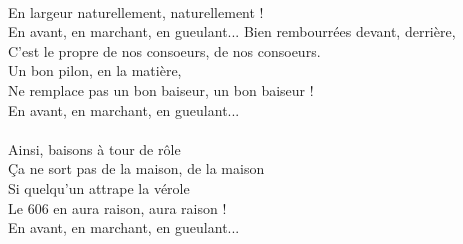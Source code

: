 \\En largeur naturellement, naturellement !
\\En avant, en marchant, en gueulant...
\breakpage
Bien rembourrées devant, derrière,
\\C'est le propre de nos consoeurs, de nos consoeurs.
\\Un bon pilon, en la matière,
\\Ne remplace pas un bon baiseur, un bon baiseur !
\\En avant, en marchant, en gueulant...
\\\\Ainsi, baisons à tour de rôle
\\Ça ne sort pas de la maison, de la maison
\\Si quelqu'un attrape la vérole
\\Le 606 en aura raison, aura raison !
\\En avant, en marchant, en gueulant...
\\
 
\breakpage